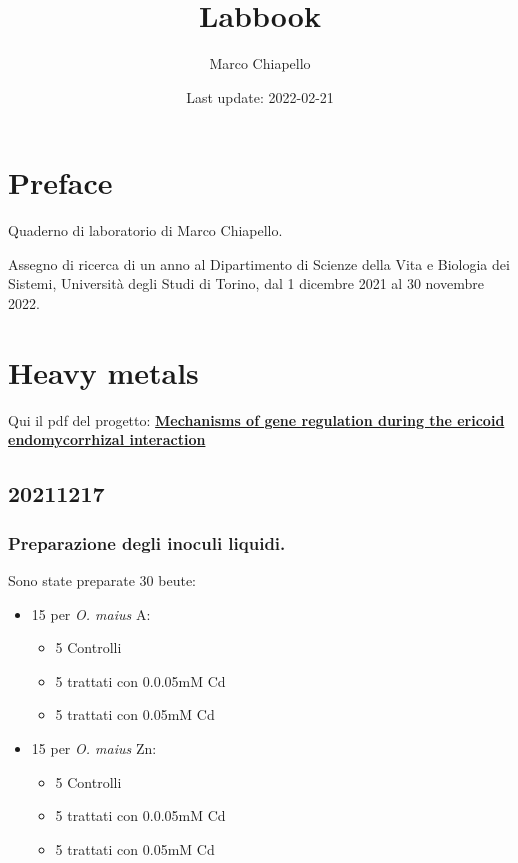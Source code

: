 \documentclass[
]{book}
\title{Labbook}
\author{Marco Chiapello}
\date{Last update: 2022-02-21}
\providecommand{\tightlist}{%
  \setlength{\itemsep}{0pt}\setlength{\parskip}{0pt}}
\begin{document}
\maketitle

{
\setcounter{tocdepth}{1}
\tableofcontents
}
\hypertarget{preface}{%
\chapter{Preface}\label{preface}}

Quaderno di laboratorio di Marco Chiapello.

Assegno di ricerca di un anno al Dipartimento di Scienze della Vita e Biologia dei Sistemi, Università degli Studi di Torino, dal 1 dicembre 2021 al 30 novembre 2022.

\hypertarget{hm}{%
\chapter{Heavy metals}\label{hm}}

Qui il pdf del progetto: \href{Documents/CHIAPELLO_proposal.pdf}{\textbf{Mechanisms of gene regulation during the ericoid endomycorrhizal interaction}}

\hypertarget{D20211217}{%
\section{20211217}\label{D20211217}}

\hypertarget{preparazione-degli-inoculi-liquidi.}{%
\subsection{Preparazione degli inoculi liquidi.}\label{preparazione-degli-inoculi-liquidi.}}

Sono state preparate 30 beute:

\begin{itemize}
\tightlist
\item
  15 per \emph{O. maius} A:

  \begin{itemize}
  \tightlist
  \item
    5 Controlli
  \item
    5 trattati con 0.0.05mM Cd
  \item
    5 trattati con 0.05mM Cd
  \end{itemize}
\item
  15 per \emph{O. maius} Zn:

  \begin{itemize}
  \tightlist
  \item
    5 Controlli
  \item
    5 trattati con 0.0.05mM Cd
  \item
    5 trattati con 0.05mM Cd
  \end{itemize}
\end{itemize}
\end{document}
